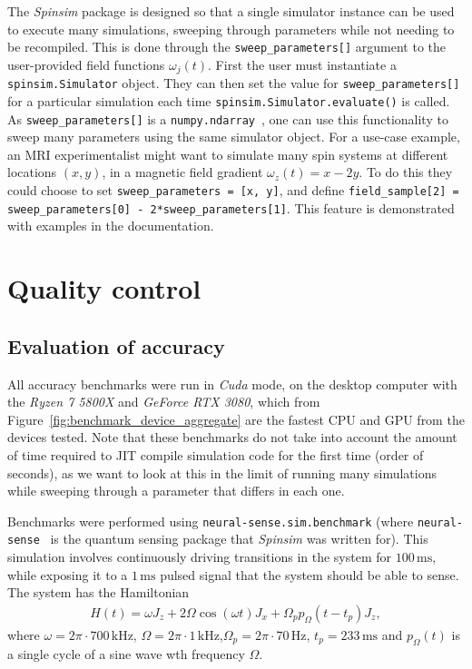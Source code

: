 \documentclass{jors}
\begin{document}
		The \emph{Spinsim} package is designed so that a single simulator instance can be used to execute many simulations, sweeping through parameters while not needing to be recompiled.
		This is done through the \texttt{sweep\_parameters[]} argument to the user-provided field functions $ \omega_j(t) $.
		First the user must instantiate a \texttt{spinsim.Simulator} object.
		They can then set the value for \texttt{sweep\_parameters[]} for a particular simulation each time \texttt{spinsim.Simulator.evaluate()} is called.
		As \texttt{sweep\_parameters[]} is a \texttt{numpy.ndarray}~\cite{harris_array_2020}, one can use this functionality to sweep many parameters using the same simulator object.
		For a use-case example, an MRI experimentalist might want to simulate many spin systems at different locations $ (x, y) $, in a magnetic field gradient $ \omega_z(t) = x - 2 y $.
		To do this they could choose to set \texttt{sweep\_parameters = [x, y]}, and define \texttt{field\_sample[2] = sweep\_parameters[0] - 2*sweep\_parameters[1]}. %
		This feature is demonstrated with examples in the documentation.

\section{Quality control}
	\subsection{Evaluation of accuracy}\label{sec:accuracy}
		All accuracy benchmarks were run in \emph{Cuda} mode, on the desktop computer with the \emph{Ryzen 7 5800X} and \emph{GeForce RTX 3080}, which from Figure~\ref{fig:benchmark_device_aggregate} are the fastest CPU and GPU from the devices tested.
		Note that these benchmarks do not take into account the amount of time required to JIT compile simulation code for the first time (order of seconds), as we want to look at this in the limit of running many simulations while sweeping through a parameter that differs in each one.
		
		Benchmarks were performed using \texttt{neural-sense.sim.benchmark} (where \texttt{neural-sense}~\cite{alexander-tritt-monash_alexander-tritt-monashneural-sense_2020} is the quantum sensing package that \emph{Spinsim} was written for).
		This simulation involves continuously driving transitions in the system for $ 100\,\text{ms} $, while exposing it to a $ 1\,\text{ms} $ pulsed signal that the system should be able to sense.
		The system has the Hamiltonian
		\begin{align}
			H(t) = \omega J_z + 2\Omega\cos(\omega t)J_x + \Omega_p p_\Omega(t - t_p) J_z,\label{eq:neural_pulse}
		\end{align}
		where $ \omega = 2\pi\cdot700\,\text{kHz} $, $ \Omega = 2\pi\cdot1\,\text{kHz} $,$ \Omega_p = 2\pi\cdot70\,\text{Hz} $, $ t_p = 233\,\text{ms} $ and $ p_\Omega(t) $ is a single cycle of a sine wave wth frequency $ \Omega $.
\end{document}
